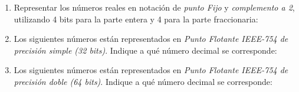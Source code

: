 \documentclass[12pt]{article}
\begin{document}
\begin{enumerate}

    \item Representar los números reales en notación de \emph{punto Fijo} y
        \emph{complemento a 2}, utilizando 4 bits para la parte entera y 4
        para la parte fraccionaria:


    \item Los siguientes números están representados en \emph{Punto Flotante
        IEEE-754 de precisión simple (32 bits)}. Indique a qué número decimal
        se corresponde:


    \item Los siguientes números están representados en \emph{Punto Flotante
        IEEE-754 de precisión doble (64 bits)}. Indique a qué número decimal
        se corresponde:

        \begin{enumerate*}[itemjoin=\hspace{2em}]


\end{enumerate*}
\end{enumerate}
\end{document}
